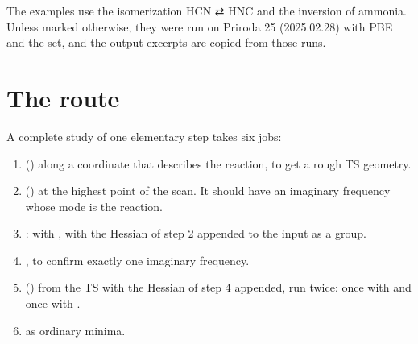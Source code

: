 \documentclass[letterpaper,10pt,english,openany,oneside]{sphinxmanual}
\begin{document}
\sphinxAtStartPar
The examples use the isomerization HCN ⇄ HNC and the inversion of ammonia. Unless marked otherwise, they were run
on Priroda 25 (2025.02.28) with PBE and the  set, and the output excerpts are copied from those runs.




\section{The route}
\label{\detokenize{tasks/ts-irc-scan:the-route}}
\sphinxAtStartPar
A complete study of one elementary step takes six jobs:
\begin{enumerate}
%
\item {} 
\sphinxAtStartPar
{} () along a coordinate that describes the reaction, to get a rough TS geometry.

\item {} 
\sphinxAtStartPar
{} () at the highest point of the scan. It should have an imaginary frequency whose mode
is the reaction.

\item {} 
\sphinxAtStartPar
{}:  with {\hyperref[\detokenize{reference/optimize:optimize-saddle}]{}}, with the Hessian of step 2 appended to the
input as a  group.

\item {} 
\sphinxAtStartPar
{}, to confirm exactly one imaginary frequency.

\item {} 
\sphinxAtStartPar
{} () from the TS with the Hessian of step 4 appended, run twice: once with
{\hyperref[\detokenize{reference/optimize:optimize-back}]{}} and once with .

\item {} 
\sphinxAtStartPar
{} as ordinary minima.

\end{enumerate}
\end{document}
